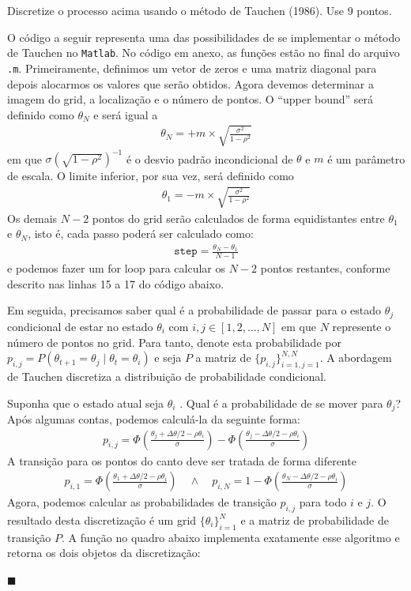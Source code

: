 \documentclass[10pt]{article}
\newcommand*{\QEDA}{\hfill\ensuremath{\blacksquare}}%
\newcommand\0{\mathbf{0}}
\newenvironment{sol}
    {\\[1em] {\color{magenta}\text{Resposta.}}
    }
    {{\color{blue!50!black}\QEDA}}
\begin{document}
Discretize o processo acima usando o método de Tauchen (1986). Use
9 pontos.
\begin{sol}
O código a seguir representa uma das possibilidades de se implementar o método de Tauchen no \verb|Matlab|. No código em anexo, as funções estão no final do arquivo \verb|.m|. Primeiramente, definimos um vetor de zeros e uma matriz diagonal para depois alocarmos os valores que serão obtidos. Agora devemos determinar a imagem do grid, a localização e o número de pontos. O ``upper bound'' será definido como $\theta_N$ e será igual a 
\begin{align*}
\theta_N = + m \times \sqrt{\frac{\sigma^2}{1-\rho^2}}
\end{align*}  
em que $\sigma(\sqrt{1-\rho^2})^{-1}$ é o desvio padrão incondicional de $\theta$ e $m$ é um parâmetro de escala. O limite inferior, por sua vez, será definido como
\begin{align*}
\theta_1 = - m \times \sqrt{\frac{\sigma^2}{1-\rho^2}}
\end{align*}
Os demais $N-2$ pontos do grid serão calculados de forma equidistantes entre $\theta_1$ e $\theta_N$, isto é, cada passo poderá ser calculado como:
\begin{align*}
\texttt{step} = \frac{\theta_N - \theta_1}{N-1}
\end{align*}
e podemos fazer um for loop para calcular os $N-2$ pontos restantes, conforme descrito nas linhas 15 a 17 do código abaixo.

Em seguida, precisamos saber qual é a probabilidade de passar para o estado $\theta_j$ condicional de estar no estado $\theta_i$ com $i, j \in [1,2, \ldots, N]$ em que $N$ represente o número de pontos no grid. Para tanto, denote esta probabilidade por $p_{i,j }= P(\theta_{t+1} = \theta_{j} \mid \theta_t = \theta_i)$ e seja $P$ a matriz de $\{p_{i,j}\}^{N,N}_{i=1,j=1}$. A abordagem de Tauchen discretiza a distribuição de probabilidade condicional.

Suponha que o estado atual seja $\theta_i$ . Qual é a probabilidade de se mover para $\theta_j$? Após algumas contas, podemos calculá-la da seguinte forma: 
\begin{align*}
p_{i,j} = \Phi\left(\frac{\theta_j + \Delta \theta / 2 - \rho \theta_i}{\sigma}\right) - \Phi\left(\frac{\theta_j - \Delta \theta / 2 - \rho \theta_i}{\sigma}\right)
\end{align*}
A transição para os pontos do canto deve ser tratada de forma diferente
\begin{align*}
p_{i,1} = \Phi\left(\frac{\theta_1 + \Delta \theta / 2 - \rho \theta_i}{\sigma}\right) \quad \land \quad p_{i,N} = 1 - \Phi\left(\frac{\theta_N - \Delta \theta / 2 - \rho \theta_i}{\sigma}\right)
\end{align*}
Agora, podemos calcular as probabilidades de transição $p_{i,j}$
para todo $i$ e $j$. O resultado desta discretização é um grid $\{\theta_i\}^N_{i=1}$ e a matriz de probabilidade de transição $P$. A função no quadro abaixo implementa exatamente esse algoritmo e retorna os dois objetos da discretização:


\end{sol}
\end{document}
